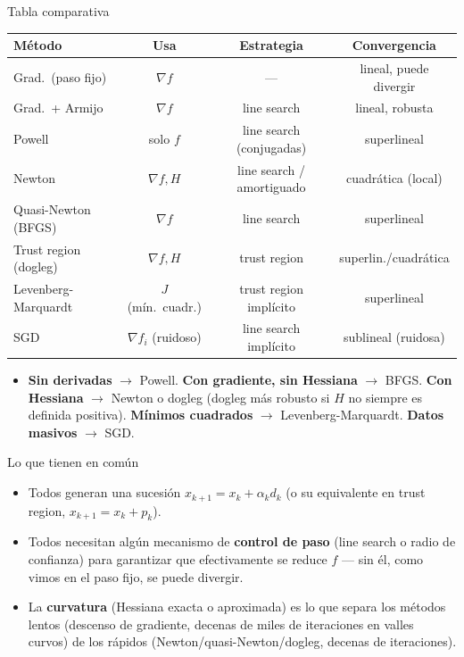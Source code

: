 \documentclass[aspectratio=169]{beamer}
\newcommand{\grad}{\nabla}
\begin{document}
\begin{frame}{Tabla comparativa}
  \footnotesize
  \begin{tabular}{lccc}
    \toprule
    M\'etodo & Usa & Estrategia & Convergencia \\
    \midrule
    Grad.\ (paso fijo) & $\grad f$ & --- & lineal, puede divergir \\
    Grad.\ + Armijo & $\grad f$ & line search & lineal, robusta \\
    Powell & solo $f$ & line search (conjugadas) & superlineal \\
    Newton & $\grad f, H$ & line search / amortiguado & cuadr\'atica (local) \\
    Quasi-Newton (BFGS) & $\grad f$ & line search & superlineal \\
    Trust region (dogleg) & $\grad f, H$ & trust region & superlin./cuadr\'atica \\
    Levenberg-Marquardt & $J$ (m\'in.\ cuadr.) & trust region impl\'icito & superlineal \\
    SGD & $\grad f_i$ (ruidoso) & line search impl\'icito & sublineal (ruidosa) \\
    \bottomrule
  \end{tabular}
  \vspace{0.4cm}
  \begin{itemize}
    \small
    \item \textbf{Sin derivadas} $\to$ Powell. \textbf{Con gradiente, sin Hessiana} $\to$ BFGS. \textbf{Con Hessiana} $\to$ Newton o dogleg (dogleg m\'as robusto si $H$ no siempre es definida positiva). \textbf{M\'inimos cuadrados} $\to$ Levenberg-Marquardt. \textbf{Datos masivos} $\to$ SGD.
  \end{itemize}
\end{frame}

\begin{frame}{Lo que tienen en com\'un}
  \begin{itemize}
    \item Todos generan una sucesi\'on $x_{k+1}=x_k+\alpha_k d_k$ (o su equivalente en trust region, $x_{k+1}=x_k+p_k$).
    \item Todos necesitan alg\'un mecanismo de \textbf{control de paso} (line search o radio de confianza) para garantizar que efectivamente se reduce $f$ --- sin \'el, como vimos en el paso fijo, se puede divergir.
    \item La \textbf{curvatura} (Hessiana exacta o aproximada) es lo que separa los m\'etodos lentos (descenso de gradiente, decenas de miles de iteraciones en valles curvos) de los r\'apidos (Newton/quasi-Newton/dogleg, decenas de iteraciones).
  \end{itemize}
\end{frame}
\end{document}
